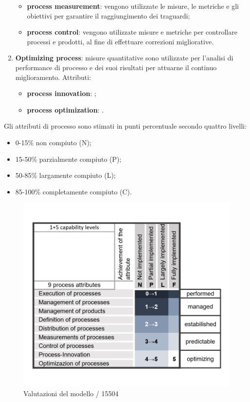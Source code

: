 \begin{enumerate}
\begin{itemize}
			\item \textbf{process measurement}: vengono utilizzate le misure, le metriche e gli obiettivi per garantire il raggiungimento dei traguardi;
			\item \textbf{process control}: vengono utilizzate misure e metriche per controllare processi e prodotti, al fine di effettuare correzioni migliorative.
		\end{itemize}
	\item \textbf{Optimizing process}: misure quantitative sono utilizzate per l'analisi di performance di processo e dei suoi risultati per attuarne il continuo miglioramento. Attributi:
		\begin{itemize}
			\item \textbf{process innovation}: ;
			\item \textbf{process optimization}: .
		\end{itemize}
\end{enumerate}
Gli attributi di processo sono stimati in punti percentuale secondo quattro livelli: 
\begin{itemize}
	\item 0-15\% non compiuto (N);
	\item 15-50\% parzialmente compiuto (P);
	\item 50-85\% largamente compiuto (L);
	\item 85-100\% completamente compiuto (C).
\end{itemize}
\begin{figure}[H]
	\centering
	\includegraphics[width=13cm]{spice.png}
	\caption{Valutazioni del modello / 15504}
\end{figure}